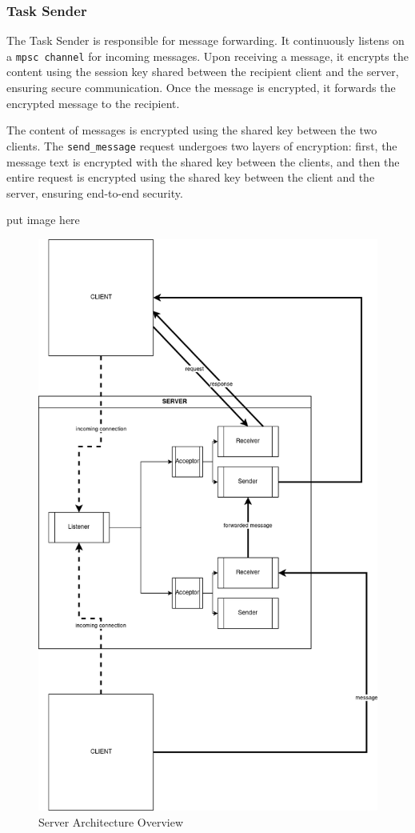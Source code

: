 \subsubsection{Task Sender}
\label{subsec:TaskSender}

The Task Sender is responsible for message forwarding. It continuously listens on a \texttt{mpsc channel} for incoming messages. Upon receiving a message, it encrypts the content using the session key shared between the recipient client and the server, ensuring secure communication. Once the message is encrypted, it forwards the encrypted message to the recipient.

The content of messages is encrypted using the shared key between the two clients. The \texttt{send\_message} request undergoes two layers of encryption: first, the message text is encrypted with the shared key between the clients, and then the entire request is encrypted using the shared key between the client and the server, ensuring end-to-end security.

put image here
\begin{figure}
  \centering
  \includegraphics[width=0.8\linewidth]{imgs/server-arch.png}
  \caption{Server Architecture Overview}
  \label{fig:architecture-overview}
\end{figure}



